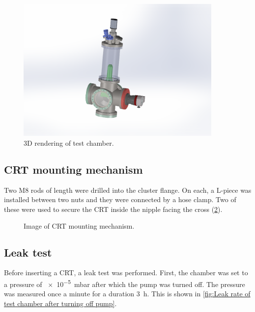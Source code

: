 \begin{figure}[ht]
	\centering
 	
	\includegraphics[width=0.9\textwidth]{./Chapters/vacuum-chamber/test_chamber} %
	
	\caption{3D rendering of test chamber.}
	\label{fig:3D rendering of test chamber}
\end{figure}
 
\subsection{CRT mounting mechanism}
\label{subsec:CRT mounting mechanism}

 Two M8 rods of length  were drilled into the cluster flange. On each, a L-piece was installed between two nuts and they were connected by a hose clamp. Two of these were used to secure the CRT inside the nipple facing the cross (\cref{fig:Image of CRT mounting mechanism}).
 

\begin{figure}[h]
	\centering
	
	
	\caption{Image of CRT mounting mechanism.}
	\label{fig:Image of CRT mounting mechanism}
\end{figure}


\subsection{Leak test}
\label{subsec:Leak test}

Before inserting a CRT, a leak test was performed. First, the chamber was set to a pressure of \SI{e-5}{\milli\bar} after which the pump was turned off. The pressure was measured once a minute for a duration \SI{3}{\hour}. This is shown in \cref{fig:Leak rate of test chamber after turning off pump}.

